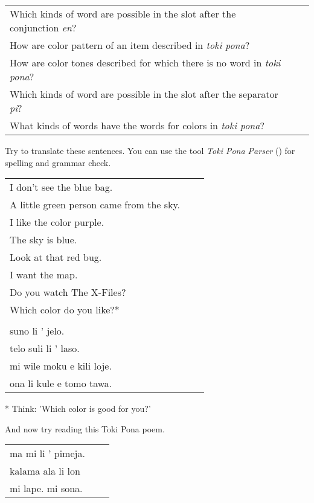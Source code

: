 \begin{supertabular}{p{5,5cm}|ll}
Which kinds of word are possible in the slot after the conjunction \textit{en}? &&  \\ %
How are color pattern of an item described in \textit{toki pona}? &&  \\ %
How are color tones described for which there is no word in \textit{toki pona}? &&  \\ %
Which kinds of word are possible in the slot after the separator \textit{pi}? &&   \\ %
What kinds of words have the words for colors in \textit{toki pona}? &&  \\ %
\end{supertabular} 

Try to translate these sentences. 
You can use the tool \textit{Toki Pona Parser} (\cite{www:rowa:02}) for spelling and grammar check. 

\begin{supertabular}{p{5,5cm}|ll}
I don't see the blue bag. &&   \\ %
A little green person came from the sky. &&   \\ %
I like the color purple.  &&  \\ %
The sky is blue. &&   \\ %
Look at that red bug.  &&  \\ %
I want the map.  &&  \\ %
Do you watch The X-Files? &&  \\  %
Which color do you like?* &&  \\  %
 && \\ %
suno li ' jelo. &&   \\ %
telo suli li ' laso.  &&  \\ %
mi wile moku e kili loje.  &&  \\ %
ona li kule e tomo tawa. &&   \\ %
\end{supertabular} 

* Think: 'Which color is good for you?' 

And now try reading this Toki Pona poem. 

\begin{supertabular}{p{5,5cm}|ll}
ma mi li ' pimeja. && \\ %
kalama ala li lon && \\ %
mi lape. mi sona. && \\ %
\end{supertabular} 
